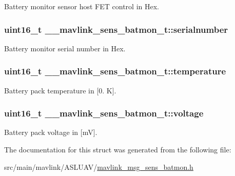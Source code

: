 Battery monitor sensor host F\+E\+T control in Hex. 

\hypertarget{struct____mavlink__sens__batmon__t_ad5a8891e7c15871d15c4825a12bc3fa7}{
\subsubsection[{serialnumber}]{\setlength{\rightskip}{0pt plus 5cm}uint16\+\_\+t \+\_\+\+\_\+mavlink\+\_\+sens\+\_\+batmon\+\_\+t\+::serialnumber}}\label{struct____mavlink__sens__batmon__t_ad5a8891e7c15871d15c4825a12bc3fa7}


Battery monitor serial number in Hex. 

\hypertarget{struct____mavlink__sens__batmon__t_a7b46f27d98753a6c2091360b7598b7e6}{
\subsubsection[{temperature}]{\setlength{\rightskip}{0pt plus 5cm}uint16\+\_\+t \+\_\+\+\_\+mavlink\+\_\+sens\+\_\+batmon\+\_\+t\+::temperature}}\label{struct____mavlink__sens__batmon__t_a7b46f27d98753a6c2091360b7598b7e6}


Battery pack temperature in \mbox{[}0. K\mbox{]}. 

\hypertarget{struct____mavlink__sens__batmon__t_a7d8816a1eb4c48924f53ded5508e145e}{
\subsubsection[{voltage}]{\setlength{\rightskip}{0pt plus 5cm}uint16\+\_\+t \+\_\+\+\_\+mavlink\+\_\+sens\+\_\+batmon\+\_\+t\+::voltage}}\label{struct____mavlink__sens__batmon__t_a7d8816a1eb4c48924f53ded5508e145e}


Battery pack voltage in \mbox{[}m\+V\mbox{]}. 



The documentation for this struct was generated from the following file\+:\begin{DoxyCompactItemize}
\item 
src/main/mavlink/\+A\+S\+L\+U\+A\+V/\hyperlink{mavlink__msg__sens__batmon_8h}{mavlink\+\_\+msg\+\_\+sens\+\_\+batmon.\+h}\end{DoxyCompactItemize}
